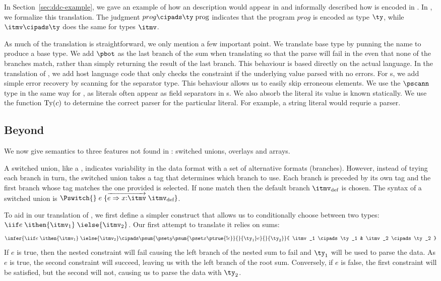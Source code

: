 In Section~\ref{sec:ddc-example}, we gave an example of how an
\ipads{} description would appear in \ddc{} and informally described
how \ipads{} is encoded in \ddc{}. In , we
formalize this translation. The judgment ${prog} \cipads \ty\;
\text{prog}$ indicates that the \ipads{} program ${prog}$ is encoded
as \ddc{} type $\ty$, while $\itmv \cipads \ty$ does the same
for \ipads{} types $\itmv$.

As much of the translation is straightforward, we only mention a few
important point. We translate base type by punning the \ipads{} name
to produce a \ddc base type. We add $\pbot$ as the last branch of the
\ddc{} sum when translating \Punion{} so that the parse will fail in
the even that none of the branches match, rather than simply returning
the result of the last branch. This behaviour is based directly on the
actual \pads{} language. In the translation of \Pwhere{}, we add host
language code that only checks the constraint if the underlying value
parsed with no errors. For \Parray{}s, we add simple error recovery by
scanning for the separator type.  This behaviour allows us to easily
skip erroneous elements. We use the $\pscann$ type in the same way for
\Plit{}, as literals often appear as field separators in \Pstruct{}s.
We also absorb the literal its value is known statically.  We use the
function ${\rm Ty}(c)$ to determine the correct parser for the particular
literal. For example, a string literal would requrie a \Pstring{}
parser.

\subsection{Beyond \ipads{}}

We now give semantics to three features not found in \ipads{}:
switched unions, overlays and \datascript{} arrays.

A switched union, like a \Punion, indicates variability in the data
format with a set of alternative formats (branches). However, instead
of trying each branch in turn, the switched union takes a tag that
determines which branch to use. Each branch is preceded by its own tag
and the first branch whose tag matches the one provided is selected.
If none match then the default branch $\itmv_{\text{def}}$ is chosen.
The syntax of a switched union is $\Pswitch{}\;e\;\{\overrightarrow{e
  \Rightarrow x{:}\itmv}\; \itmv_{\text{def}}\}$.

To aid in our translation of \Pswitch{}, we first define a simpler
construct that allows us to conditionally choose between two types:
$\iif e\; \ithen {\itmv_1}\; \ielse {\itmv_2}$. Our first attempt to
translate it relies on \ddc{} sums:
\[
\infer{
  \iif e\; \ithen {\itmv_1}\; \ielse {\itmv_2} 
  \cipads \psum
  {\pset y {\psum {\pset x \ptrue {!e}} {} {\ty_1}} e}
  {} {\ty_2}
}{
  \itmv_1 \cipads \ty_1 &
  \itmv_2 \cipads \ty_2
}
\]
If $e$ is true, then the nested constraint will fail causing the left
branch of the nested sum to fail and $\ty_1$ will be used to parse
the data. As $e$ is true, the second constraint will succeed, leaving
us with the left branch of the root sum. Conversely, if $e$ is false,
the first constraint will be satisfied, but the second will not,
causing us to parse the data with $\ty_2$. 

